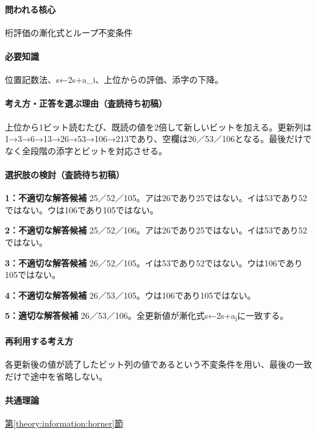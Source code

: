 \paragraph{問われる核心} 桁評価の漸化式とループ不変条件

\paragraph{必要知識} 位置記数法、s←2s+a\_i、上位からの評価、添字の下降。

\paragraph{考え方・正答を選ぶ理由（査読待ち初稿）} 上位から1ビット読むたび、既読の値を2倍して新しいビットを加える。更新列は1→3→6→13→26→53→106→213であり、空欄は26／53／106となる。最後だけでなく全段階の添字とビットを対応させる。

\paragraph{選択肢の検討（査読待ち初稿）}\mbox{}\par

\noindent\textbf{1：不適切な解答候補} 25／52／105。アは26であり25ではない。イは53であり52ではない。ウは106であり105ではない。\par

\noindent\textbf{2：不適切な解答候補} 25／52／106。アは26であり25ではない。イは53であり52ではない。\par

\noindent\textbf{3：不適切な解答候補} 26／52／105。イは53であり52ではない。ウは106であり105ではない。\par

\noindent\textbf{4：不適切な解答候補} 26／53／105。ウは106であり105ではない。\par

\noindent\textbf{5：適切な解答候補} 26／53／106。全更新値が漸化式s←2s+a\textsubscript{i}に一致する。\par

\paragraph{再利用する考え方} 各更新後の値が読了したビット列の値であるという不変条件を用い、最後の一致だけで途中を省略しない。

\paragraph{共通理論} \hyperref[theory:information:horner]{第\ref*{theory:information:horner}節}

